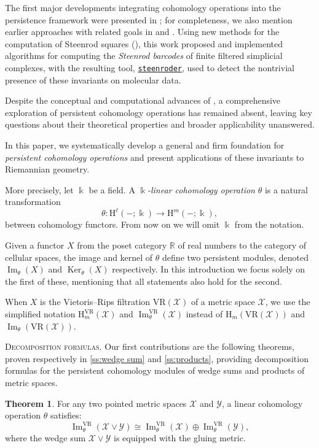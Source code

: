 \documentclass{amsart}
\theoremstyle{definition}
\newcommand{\R}{\mathbb{R}}
\renewcommand{\k}{\Bbbk}
\newcommand{\rH}{\mathrm{H}}
\newcommand{\cX}{\mathcal{X}}
\newcommand{\cY}{\mathcal{Y}}
\newcommand{\VR}{\mathrm{VR}}
\theoremstyle{theorem}
\newtheorem{introtheorem}{Theorem}
\DeclareMathOperator{\img}{Im}
\renewcommand{\ker}{\operatorname{Ker}}
\begin{document}
The first major developments integrating cohomology operations into the persistence framework were presented in \cite{medina2022per_st}; for completeness, we also mention earlier approaches with related goals in \cite{aubrey2011thesis} and \cite{postol2023persistence}.
Using new methods for the computation of Steenrod squares (\cite{medina2023fast_sq}), this work proposed and implemented algorithms for computing the \textit{Steenrod barcodes} of finite filtered simplicial complexes, with the resulting tool, \href{https://steenroder.github.io/steenroder/}{\texttt{steenroder}}, used to detect the nontrivial presence of these invariants on molecular data.

Despite the conceptual and computational advances of \cite{medina2022per_st}, a comprehensive exploration of persistent cohomology operations has remained absent, leaving key questions about their theoretical properties and broader applicability unanswered.

In this paper, we systematically develop a general and firm foundation for \textit{persistent cohomology operations} and present applications of these invariants to Riemannian geometry.

\medskip More precisely, let \(\k\) be a field.
A \textit{\(\k\)-linear cohomology operation} \(\theta\) is a natural transformation
\[
\theta \colon \rH^\ell(-;\k) \to \rH^m(-;\k),
\]
between cohomology functors.
From now on we will omit \(\k\) from the notation.

Given a functor \(X\) from the poset category $\R$ of real numbers to the category of cellular spaces, the image and kernel of \(\theta\) define two persistent modules, denoted \(\img_\theta(X)\) and \(\ker_\theta(X)\) respectively.
In this introduction we focus solely on the first of these, mentioning that all statements also hold for the second.

When \(X\) is the Vietoris--Rips filtration \(\VR(\cX)\) of a metric space \(\cX\), we use the simplified notation \(\rH_m^\VR(\cX)\) and \(\img_\theta^\VR(\cX)\) instead of \(\rH_m(\VR(\cX))\) and \(\img_\theta(\VR(\cX))\).

\medskip\noindent\textsc{Decomposition formulas.}
Our first contributions are the following theorems, proven respectively in \cref{ss:wedge sum} and \cref{ss:products}, providing decomposition formulas for the persistent cohomology modules of wedge sums and products of metric spaces.

\begin{introtheorem}\label{thm:decomposition1}
	For any two pointed metric spaces $\cX$ and $\cY$, a linear cohomology operation \(\theta\) satisfies:
	\[
	\img_\theta^\VR(\cX \vee \cY) \cong \img_\theta^\VR(\cX) \oplus \img_\theta^\VR(\cY),
	\]
	where the wedge sum \(\cX \vee \cY\) is equipped with the gluing metric.
\end{introtheorem}
\end{document}
